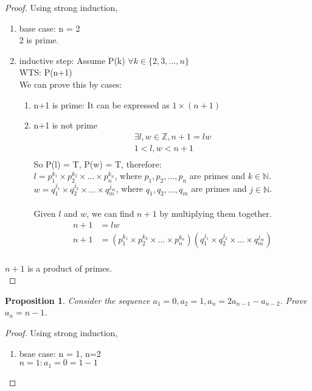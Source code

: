 \documentclass{article}
\newcommand{\AllIntegers}{\mathbb{Z}}
\newcommand{\AllNaturals}{\mathbb{N}}
\newtheorem{proposition}{Proposition}
\begin{document}
\begin{proof}
    Using strong induction,
    \begin{enumerate}
        \item base case: n = 2\\
        2 is prime.
        \item inductive step: Assume P(k) \(\forall k \in \{2,3,...,n\}\)\\
        WTS: P(n+1)\\
        We can prove this by cases:
        \begin{enumerate}
            \item n+1 is prime:
                It can be expressed as \(1 \times  (n+1)\)
            \item n+1 is not prime\\
            \begin{align*}
                \exists l,w \in \AllIntegers, n+1 = lw\\
                1 < l, w < n+1\\
            \end{align*}
            So P(l) = T, P(w) = T, therefore:\\
            \(l = p_1^{k_1}\times p_2^{k_2} \times ... \times p_n^{k_n}\), where \(p_1, p_2, ..., p_n\) are primes and \(k\in \AllNaturals\).\\
            \(w = q_1^{j_1}\times q_2^{j_2} \times ... \times q_m^{j_m}\), where \(q_1, q_2, ..., q_m\) are primes and \(j\in \AllNaturals\).\\\\
            Given \(l\) and \(w\), we can find \(n+1\) by multiplying them together.\\
            \begin{align*}
                n+1 &= lw\\
                n+1 &= (p_1^{k_1}\times p_2^{k_2} \times ... \times p_n^{k_n}) (q_1^{j_1}\times q_2^{j_2} \times ... \times q_m^{j_m})\\
            \end{align*}
        \end{enumerate}
    \end{enumerate}
    \(n+1\) is a product of primes.\\
\end{proof}
\pagebreak
\begin{proposition}
    Consider the sequence \(a_1=0, a_2=1, a_n=2a_{n-1}-a_{n-2}\). Prove \(a_n = n-1\).
\end{proposition}
\begin{proof}
    Using strong induction,
    \begin{enumerate}
        \item bsae case: n = 1, n=2\\
        \(n=1: a_1 = 0 = 1-1\)\\
    \end{enumerate}
\end{proof}
\end{document}
